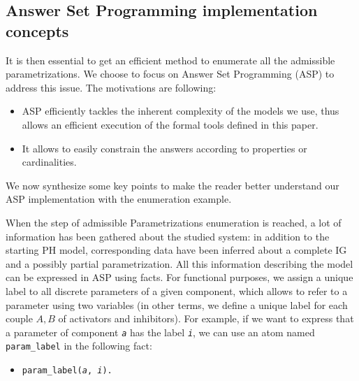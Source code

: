 \begin{comment}
\begin{definition}[Admissible parametrization \& Admissible parametrization with respect to inferred parameters]
\label{def:param_enum_inf}
Let $\PH = (\PHs, \PHl, \PHh)$ be a PH so that IG inference is possible, and $\IG = (\Gamma, E_+,
E_-)$ the inferred IG.
A parametrization $K$ on $\IG$ is said to be \emph{admissible} iff it respects
the extreme values assumption, the activity assumption and the monotonicity assumption.
A parametrization $K$ on $\IG$ is said to be \emph{admissible with respect to the
inferred parameters} iff it is admissible and that all parameters that can be inferred regarding
\pref{pps:param_K} are equal to their inferred value.
\end{definition}

\todo{utilité de “Admissible parametrization” seul ?}
\end{comment}


\subsection{Answer Set Programming implementation concepts}

\newcommand{\ti}[1]{\texttt{\textit{#1}}}
\newcommand{\aspil}[1]{\texttt{#1}}
\newcommand{\asp}[1]{\begin{itemize} \item[] \aspil{#1} \end{itemize}}

It is then essential to get an efficient method to enumerate all the admissible parametrizations. We choose to focus on Answer Set Programming (ASP) \cite{Baral03} to address this issue. The motivations are following: 
\begin{itemize}
\item ASP efficiently tackles the inherent complexity of the models we use, thus allows an efficient execution of the formal tools defined in this paper.
\item It allows to easily constrain the answers according to properties or cardinalities.
\end{itemize}
We now synthesize some key points to make the reader better understand our ASP implementation with the enumeration example.

When the step of admissible Parametrizations enumeration is reached, a lot of information has been gathered about the studied system: in addition to the starting PH model, corresponding data have been inferred about a complete IG and a possibly partial parametrization.
All this information describing the model can be expressed in ASP using facts.
For functional purposes, we assign a unique label to all discrete parameters of a given component, which allows to refer to a parameter using two variables (in other terms, we define a unique label for each couple $A,B$ of activators and inhibitors).
For example, if we want to express that a parameter of component \ti{a} has the label \ti{i}, we can use an atom named \aspil{param\_label} in the following fact:
\asp{param\_label(\ti{a}, \ti{i}).}

